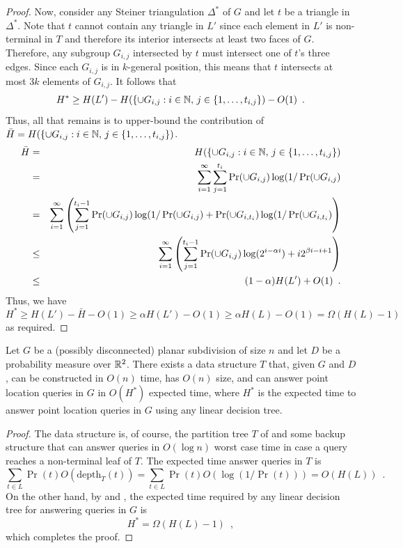 \documentclass{patmorin}
\newcommand{\depth}{\mathrm{depth}}
\begin{document}
\begin{proof}
  Now, consider any Steiner triangulation $\Delta^*$ of $G$ and let
  $t$ be a triangle in $\Delta^*$.  Note that $t$ cannot contain any
  triangle in $L'$ since each element in $L'$ is non-terminal in $T$
  and therefore its interior intersects at least two faces of $G$.
  Therefore, any subgroup $G_{i,j}$ intersected by $t$ must intersect one
  of $t$'s three edges. Since each $G_{i,j}$ is in $k$-general position,
  this means that $t$ intersects at most $3k$ elements of $G_{i,j}$.
  It follows \cite[Lemma~3]{cdilm09} that
  \[
    H^* \ge H(L') 
       - H(\{\cup G_{i,j}:i\in\mathbb{N},\, j \in\{1,\ldots,t_{i,j}\}) 
       - O(1) \enspace .
  \]
  Thus, all that remains is to upper-bound the contribution of $\bar{H}=H(\{\cup G_{i,j}:i\in\mathbb{N},\, j \in\{1,\ldots,t_{i,j}\})$.
  \begin{eqnarray*}
    \bar{H} &= & H(\{\cup G_{i,j}:i\in\mathbb{N},\, j \in\{1,\ldots,t_{i,j}\}) \\
     & = & \sum_{i=1}^\infty \sum_{j=1}^{t_{i}} 
         \Pr(\cup G_{i,j})\log(1/\Pr(\cup G_{i,j}) \\
   & = & \sum_{i=1}^\infty
        \left( 
          \sum_{j=1}^{t_{i}-1} 
             \Pr(\cup G_{i,j})\log(1/\Pr(\cup G_{i,j}) 
             + \Pr(\cup G_{i,t_i})\log(1/\Pr(\cup G_{i,t_i})
        \right) \\
   & \le & \sum_{i=1}^\infty
        \left( 
          \sum_{j=1}^{t_{i}-1} 
             \Pr(\cup G_{i,j})\log(2^{i-\alpha i})
             + i 2^{\beta i - i + 1}
        \right) \\
    & \le & (1-\alpha)H(L') + O(1) \enspace .
  \end{eqnarray*}
  Thus, we have 
  \[  
     H^* \ge H(L') - \bar{H} -O(1) \ge \alpha H(L') - O(1) 
         \ge \alpha H(L) - O(1) = \Omega(H(L) - 1) 
  \]
  as required.
\end{proof}

\begin{thm}
  Let $G$ be a (possibly disconnected) planar subdivision of size $n$
  and let $D$ be a probability measure over $\mathbb{R}^2$.  There exists a data
  structure $T$ that, given $G$ and $D$, can be constructed in $O(n)$
  time, has $O(n)$ size, and can answer point location queries in $G$
  in $O(H^*)$ expected time, where $H^*$ is the expected time to answer
  point location queries in $G$ using any linear decision tree.
\end{thm}

\begin{proof}
  The data structure is, of course, the partition tree $T$ of
   and some backup structure that can answer
  queries in $O(\log n)$ worst case time in case a query reaches a
  non-terminal leaf of $T$.  The expected time answer queries in $T$ is
  \[
     \sum_{t\in L} \Pr(t)O(\depth_T(t)) = \sum_{t\in L}\Pr(t)O(\log(1/\Pr(t))) = O(H(L)) \enspace .
  \]
  On the other hand, by  and ,
  the expected time required by any linear decision tree for answering
  queries in $G$ is
  \[
      H^* = \Omega(H(L) - 1) \enspace ,
  \]
  which completes the proof.
\end{proof}
\end{document}

